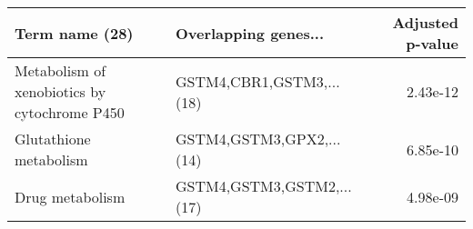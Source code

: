 \begin{tabular}{llr}
\toprule
                              Term name (28) &      Overlapping genes... &  Adjusted p-value \\
\midrule
Metabolism of xenobiotics by cytochrome P450 &  GSTM4,CBR1,GSTM3,...(18) &          2.43e-12 \\
                      Glutathione metabolism &  GSTM4,GSTM3,GPX2,...(14) &          6.85e-10 \\
                             Drug metabolism & GSTM4,GSTM3,GSTM2,...(17) &          4.98e-09 \\
\bottomrule
\end{tabular}

